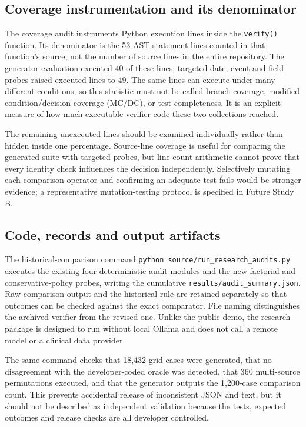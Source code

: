 \documentclass[11pt,twocolumn]{article}
\newcommand{\code}[1]{\texttt{#1}}
\begin{document}
\subsection{Coverage instrumentation and its denominator}
The coverage audit instruments Python execution lines inside the \code{verify()} function. Its denominator is the 53 AST statement lines counted in that function's source, not the number of source lines in the entire repository. The generator evaluation executed 40 of these lines; targeted date, event and field probes raised executed lines to 49. The same lines can execute under many different conditions, so this statistic must not be called branch coverage, modified condition/decision coverage (MC/DC), or test completeness. It is an explicit measure of how much executable verifier code these two collections reached.

The remaining unexecuted lines should be examined individually rather than hidden inside one percentage. Source-line coverage is useful for comparing the generated suite with targeted probes, but line-count arithmetic cannot prove that every identity check influences the decision independently. Selectively mutating each comparison operator and confirming an adequate test fails would be stronger evidence; a representative mutation-testing protocol is specified in Future Study B.

\subsection{Code, records and output artifacts}
The historical-comparison command \code{python source/run\_research\_audits.py} executes the existing four deterministic audit modules and the new factorial and conservative-policy probes, writing the cumulative \code{results/audit\_summary.json}. Raw comparison output and the historical rule are retained separately so that outcomes can be checked against the exact comparator. File naming distinguishes the archived verifier from the revised one. Unlike the public demo, the research package is designed to run without local Ollama and does not call a remote model or a clinical data provider.

The same command checks that 18,432 grid cases were generated, that no disagreement with the developer-coded oracle was detected, that 360 multi-source permutations executed, and that the generator outputs the 1,200-case comparison count. This prevents accidental release of inconsistent JSON and text, but it should not be described as independent validation because the tests, expected outcomes and release checks are all developer controlled.
\end{document}
